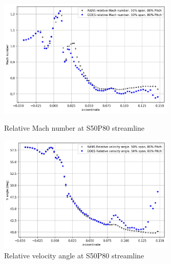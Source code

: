 \begin{figure}[ht]
  \centering
  \includegraphics[width=0.75\textwidth]{Pictures/mach-rel-S50-P80.png}
  \caption{Relative Mach number at S50P80 streamline} \label{mach-rel-S50-P80}
  \vspace*{\floatsep}%
  \includegraphics[width=0.75\textwidth]{Pictures/vang-rel-S50-P80.png}
  \caption{Relative velocity angle at S50P80 streamline} \label{vang-rel-S50-P80}
\end{figure}

